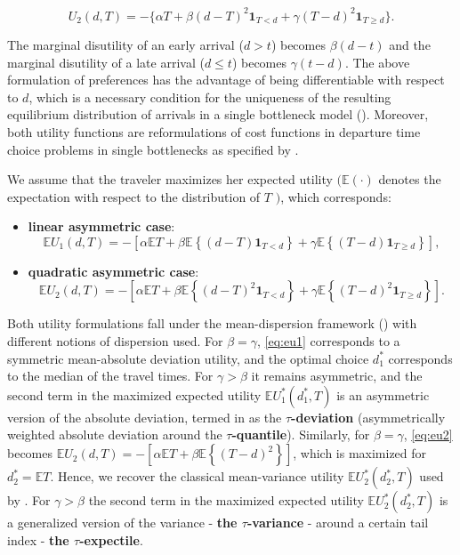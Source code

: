 \documentclass[preprint, 3p, authoryear]{elsarticle} %
\theoremstyle{definition}
\theoremstyle{definition}
\theoremstyle{definition}
\theoremstyle{definition}
\theoremstyle{remark}
\begin{document}
\[U_2(d,T) = -\{\alpha T + \beta(d-T)^2\mathbf 1_{T<d} + \gamma (T-d)^2\mathbf 1_{T\geq d}\}.\]

The marginal disutility of an early arrival (\(d>t\)) becomes \(\beta (d-t)\) and the marginal disutility of a late arrival (\(d\leq t\)) becomes \(\gamma (t-d)\). The above formulation of preferences has the advantage of being differentiable with respect to \(d\), which is a necessary condition for the uniqueness of the resulting equilibrium distribution of arrivals in a single bottleneck model (\citet{daganzo1985}). Moreover, both utility functions are reformulations of cost functions in departure time choice problems in single bottlenecks as specified by \citet{lindsey2004}.

We assume that the traveler maximizes her expected utility \(\big(\mathbb E(\cdot)\) denotes the expectation with respect to the distribution of \(T\) \(\big)\), which corresponds:

\begin{itemize}
\item
  \textbf{linear asymmetric case}:
  \begin{equation}\mathbb EU_1(d,T) = -\left[\alpha \mathbb ET + \beta\mathbb E\left\{(d-T)\mathbf 1_{T<d} \right\}+ \gamma \mathbb E\left\{(T-d)\mathbf 1_{T\geq d}\right\}\right], \label{eq:eu1}
  \end{equation}
\item
  \textbf{quadratic asymmetric case}:
  \begin{equation}
  \mathbb EU_2(d,T) = -\left[\alpha \mathbb ET + \beta\mathbb E\left\{(d-T)^2\mathbf 1_{T<d} \right\}+ \gamma \mathbb E\left\{(T-d)^2\mathbf 1_{T\geq d}\right\}\right]. \label{eq:eu2}
  \end{equation}
\end{itemize}

Both utility formulations fall under the mean-dispersion framework (\citet{engelson2016}) with different notions of dispersion used. For \(\beta=\gamma\), \eqref{eq:eu1} corresponds to a symmetric mean-absolute deviation utility, and the optimal choice \(d^*_1\) corresponds to the median of the travel times. For \(\gamma>\beta\) it remains asymmetric, and the second term in the maximized expected utility \(\mathbb EU^*_1(d_1^*,T)\) is an asymmetric version of the absolute deviation, termed in \citet{tran2019} as the \textbf{\(\tau\)-deviation} (asymmetrically weighted absolute deviation around the \textbf{\(\tau\)-quantile}). Similarly, for \(\beta=\gamma\), \eqref{eq:eu2} becomes \(\mathbb EU_2(d,T) = -\left[\alpha \mathbb ET + \beta\mathbb E\left\{(T-d)^2\right\}\right]\),
which is maximized for \(d_2^* = \mathbb ET\). Hence, we recover the classical mean-variance utility \(\mathbb EU^*_2(d_2^*,T)\) used by \citet{jackson1982}. For \(\gamma>\beta\) the second term in the maximized expected utility \(\mathbb EU^*_2(d_2^*,T)\) is a generalized version of the variance - \textbf{the \(\tau\)-variance} - around a certain tail index - \textbf{the \(\tau\)-expectile}.
\end{document}
